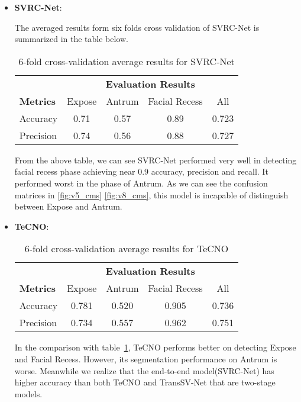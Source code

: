 \documentclass[11pt]{article} \usepackage[top=1in, bottom=1in, left=1in, right=1in]{geometry}
\begin{document}
\begin{itemize}
    \item \textbf{SVRC-Net}:
    
    The averaged results form six folds cross validation of SVRC-Net is summarized in the table below.
    \begin{table}[ht!] 
        \centering
        \begin{tabular}{l c c c c}
        \toprule %
        & \multicolumn{4}{c}{\textbf{Evaluation Results}} \\ 
        \cmidrule(l){2-5}
        \textbf{Metrics} & Expose & Antrum & Facial Recess & All\\ 
        \midrule %
            Accuracy  &  0.71 &  0.57 &  0.89 & 0.723\\
            Precision &  0.74 &  0.56 &  0.88 & 0.727\\
        \bottomrule %
        \end{tabular}
        \caption{6-fold cross-validation average results for SVRC-Net}
        \label{tab:6foldSVRC} 
    \end{table}
    From the above table, we can see SVRC-Net performed very well in detecting facial recess phase achieving near 0.9 accuracy, precision and recall. It performed worst in the phase of Antrum. As we can see the confusion matrices in \ref{fig:v5_cms} \ref{fig:v8_cms}, this model is incapable of distinguish between Expose and Antrum. 
    \item \textbf{TeCNO}:
    \begin{table}[ht!] 
        \centering
        \begin{tabular}{l c c c c}
        \toprule %
        & \multicolumn{4}{c}{\textbf{Evaluation Results}} \\ 
        \cmidrule(l){2-5}
        \textbf{Metrics} & Expose & Antrum & Facial Recess & All\\ 
        \midrule %
            Accuracy  &  0.781 &  0.520 &  0.905 & 0.736\\
            Precision &  0.734 &  0.557 &  0.962 & 0.751\\
        \bottomrule %
        \end{tabular}
        \caption{6-fold cross-validation average results for TeCNO}
        \label{tab:6foldTeCNO} 
    \end{table}
    In the comparison with table~\ref{tab:6foldSVRC}, TeCNO performs better on detecting Expose and Facial Recess. However, its segmentation performance on Antrum is worse. Meanwhile we realize that the end-to-end model(SVRC-Net) has higher accuracy than both TeCNO and TransSV-Net that are two-stage models. 

\end{itemize}
\end{document}
